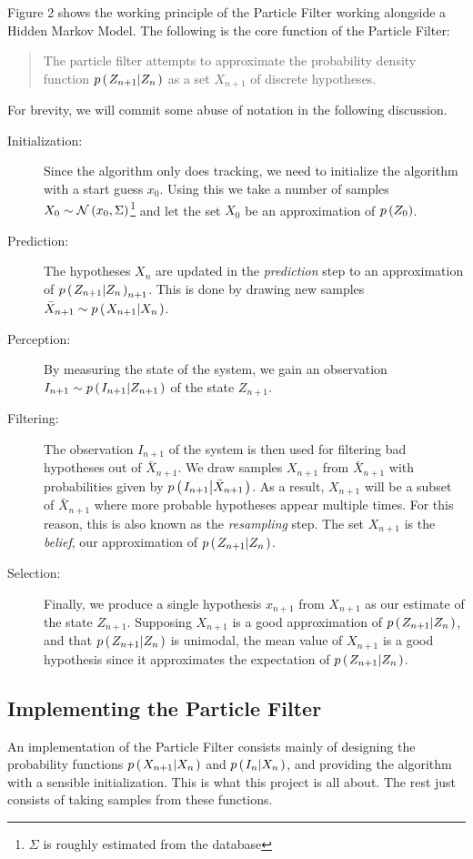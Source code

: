 Figure 2 shows the working principle of the Particle Filter working alongside a Hidden Markov Model. The following is the core function of the Particle Filter:

\begin{quote}
 The particle filter attempts to approximate the probability density function $p\left(\left. Z_{n+1} \middle\vert Z_n \right.\right)$ as a set $X_{n+1}$ of discrete hypotheses.
\end{quote}

For brevity, we will commit some abuse of notation in the following discussion.

\begin{description}
\item[Initialization:] Since the algorithm only does tracking, we need to initialize the algorithm with a start guess $x_0$. Using this we take a number of samples $X_0 \sim \mathcal{N}\left(x_0, \Sigma\right)$\footnote{$\Sigma$ is roughly estimated from the database} and let the set $X_0$ be an approximation of $p\left(Z_0\right)$.
\item[Prediction:] The hypotheses $X_n$ are updated in the \emph{prediction} step to an approximation of $p\left(\left. Z_{n+1} \middle\vert Z_n \right.\right)_{n+1}$. This is done by drawing new samples $\bar{X}_{n+1} \sim p\left(\left. X_{n+1} \middle\vert X_n \right.\right)$.
\item[Perception:] By measuring the state of the system, we gain an observation $I_{n+1} \sim p\left(\left. I_{n+1} \middle\vert Z_{n+1} \right.\right)$ of the state $Z_{n+1}$.
\item[Filtering:] The observation $I_{n+1}$ of the system is then used for filtering bad hypotheses out of $\bar{X}_{n+1}$. We draw samples $X_{n+1}$ from $\bar{X}_{n+1}$ with probabilities given by $p\left(\left. I_{n+1} \middle\vert \bar{X}_{n+1} \right.\right)$. As a result, $X_{n+1}$ will be a subset of $\bar{X}_{n+1}$ where more probable hypotheses appear multiple times. For this reason, this is also known as the \emph{resampling} step. The set $X_{n+1}$ is the \emph{belief}, our approximation of $p\left(\left. Z_{n+1} \middle\vert Z_n \right.\right)$.
\item[Selection:] Finally, we produce a single hypothesis $x_{n+1}$ from $X_{n+1}$ as our estimate of the state $Z_{n+1}$. Supposing $X_{n+1}$ is a good approximation of $p\left(\left. Z_{n+1} \middle\vert Z_n \right.\right)$, and that $p\left(\left. Z_{n+1} \middle\vert Z_n \right.\right)$ is unimodal, the mean value of $X_{n+1}$ is a good hypothesis since it approximates the expectation of $p\left(\left. Z_{n+1} \middle\vert Z_n \right.\right)$.
\end{description}

\subsection*{Implementing the Particle Filter}
An implementation of the Particle Filter consists mainly of designing the probability functions $p\left(\left. X_{n+1} \middle\vert X_n \right.\right)$ and $p\left(\left. I_n \middle\vert X_n \right.\right)$, and providing the algorithm with a sensible initialization. This is what this project is all about. The rest just consists of taking samples from these functions.
